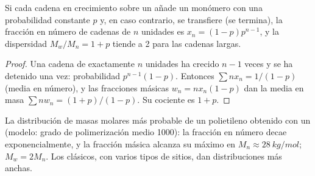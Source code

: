 \begin{proposition}\label{prop:b3:homogeneous-catalysis:schulz-flory}
Si cada cadena en crecimiento sobre un  añade un monómero con una
probabilidad constante $p$ y, en caso contrario, se transfiere (se termina), la fracción en número de
cadenas de $n$ unidades es $x_n = (1 - p)p^{n-1}$, y la dispersidad $M_w/M_n = 1 + p$ tiende a 2 para las cadenas largas.
\end{proposition}

\begin{proof}
Una cadena de exactamente $n$ unidades ha crecido $n - 1$ veces y se ha detenido una vez:
probabilidad $p^{n-1}(1 - p)$. Entonces $\sum nx_n = 1/(1 - p)$ (media en número), y las fracciones
másicas $w_n = nx_n(1 - p)$ dan la media en masa $\sum nw_n = (1 + p)/(1 - p)$. Su
cociente es $1 + p$.
\end{proof}

\begin{omfigure}

{\small La distribución de masas molares más probable de un polietileno obtenido con un
 (modelo: grado de polimerización medio 1000): la fracción en
número decae exponencialmente, y la fracción másica alcanza su máximo en $M_n \approx \qty{28}{kg/mol}$; $M_w = 2M_n$. Los  clásicos, con varios tipos de sitios, dan distribuciones
más anchas.}
\end{omfigure}

